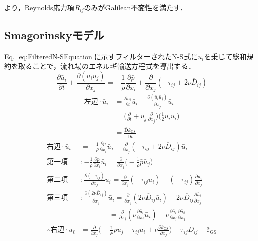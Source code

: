 \documentclass[12pt,a4paper]{jsarticle}
\begin{document}
より，Reynolds応力項$R_{ij}$のみがGalilean不変性を満たす．

\subsection{Smagorinskyモデル}
\label{subsec:SmagorinskyModel}

Eq. \ref{eq:FilteredN-SEquation}に示すフィルターされたN-S式に$\bar{u}_i$を乗じて総和規約を取ることで，流れ場のエネルギ輸送方程式を導出する．
\begin{equation}
  \frac{\partial \bar{u}_i}{\partial t} +\frac{\partial (\bar{u}_i \bar{u}_j)}{\partial x_j} = -\frac{1}{\rho} \frac{\partial \bar{p}}{\partial x_i} +\frac{\partial}{\partial x_j} (-\tau_{ij} +2 \nu \overline{D}_{ij}) \tag{7.16}
\label{eq:FilteredN-SEquation}
\end{equation}
\begin{align}
  左辺 \cdot \bar{u}_i &= \frac{\partial \bar{u}_i}{\partial t} \bar{u}_i +\frac{\partial (\bar{u}_i \bar{u}_j)}{\partial x_j} \bar{u}_i \nonumber \\
    &= \Big( \frac{\partial}{\partial t} +\bar{u}_j \frac{\partial}{\partial x_j} \Big) \Big( \frac{1}{2}\bar{u}_i \bar{u}_i \Big) \nonumber \\
    &= \frac{ \overline{\mathrm{D}} k_{\mathrm{GS}} }{ \overline{\mathrm{D}} t}
\label{eq:L_sideofkgs}
\end{align}
\begin{align}
  右辺 \cdot \bar{u}_i &= -\frac{1}{\rho} \frac{\partial \bar{p}}{\partial x_i} \bar{u}_i +\frac{\partial}{\partial x_j} (-\tau_{ij} +2 \nu \overline{D}_{ij}) \bar{u}_i \nonumber \\
    第一項 &: -\frac{1}{\rho} \frac{\partial \bar{p}}{\partial x_i} \bar{u}_i = \frac{\partial}{\partial x_j} \Big( -\frac{1}{\rho} \bar{p}\bar{u}_j \Big) \nonumber \\
    第二項 &: \frac{\partial (-\tau_{ij})}{\partial x_j} \bar{u}_i = \frac{\partial}{\partial x_j} (-\tau_{ij} \bar{u}_i) -(-\tau_{ij}) \frac{\partial \bar{u}_i}{\partial x_j} \nonumber \\
    第三項 &: \frac{\partial (2 \nu \overline{D}_{ij}) }{\partial x_j} \bar{u}_i = \frac{\partial}{\partial x_j} (2 \nu \overline{D}_{ij} \bar{u}_i) -2 \nu \overline{D}_{ij} \frac{\partial \bar{u}_i}{\partial x_j} \nonumber \\
      &~~~~~~~~~~~~~~~~~~= \frac{\partial}{\partial x_j} (\nu \frac{\partial \bar{u}_i}{\partial x_j} \bar{u}_i) -\nu \frac{\partial \bar{u}_i}{\partial x_j} \frac{\partial \bar{u}_i}{\partial x_j} \nonumber \\
  \therefore 右辺 \cdot \bar{u}_i &= \frac{\partial}{\partial x_j} \Big( -\frac{1}{\rho}\bar{p}\bar{u}_j -\tau_{ij}\bar{u}_i +\nu \frac{\partial k_{\mathrm{GS}}}{\partial x_j} \Big) +\tau_{ij} \overline{D}_{ij} -\bar{\varepsilon}_{\mathrm{GS}}
\label{eq:R_sideofkgs}
\end{align}
\end{document}
